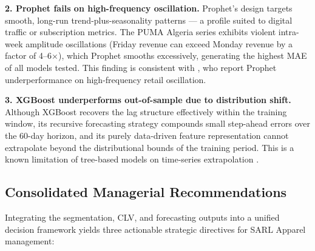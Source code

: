 \textbf{2. Prophet fails on high-frequency oscillation.} Prophet's design targets smooth, long-run trend-plus-seasonality patterns — a profile suited to digital traffic or subscription metrics. The PUMA Algeria series exhibits violent intra-week amplitude oscillations (Friday revenue can exceed Monday revenue by a factor of 4--6$\times$), which Prophet smooths excessively, generating the highest MAE of all models tested. This finding is consistent with \cite{zb51_07}, who report Prophet underperformance on high-frequency retail oscillation.

\textbf{3. XGBoost underperforms out-of-sample due to distribution shift.} Although XGBoost recovers the lag structure effectively within the training window, its recursive forecasting strategy compounds small step-ahead errors over the 60-day horizon, and its purely data-driven feature representation cannot extrapolate beyond the distributional bounds of the training period. This is a known limitation of tree-based models on time-series extrapolation \cite{reportKuijt2022}.

\subsection{Consolidated Managerial Recommendations}

Integrating the segmentation, CLV, and forecasting outputs into a unified decision framework yields three actionable strategic directives for SARL Apparel management:

